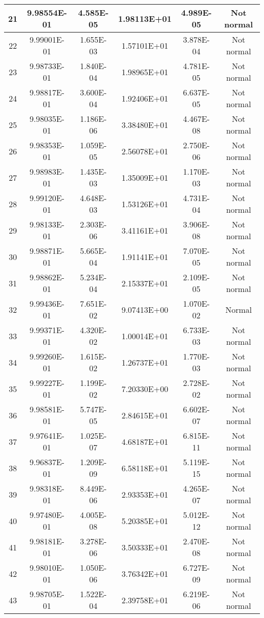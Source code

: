\begin{table}[h]
\begin{tabular}{|c|c|c|c|c|c|}
		21 & 9.98554E-01 & 4.585E-05 & 1.98113E+01 & 4.989E-05 & Not normal\\\hline
		22 & 9.99001E-01 & 1.655E-03 & 1.57101E+01 & 3.878E-04 & Not normal\\\hline
		23 & 9.98733E-01 & 1.840E-04 & 1.98965E+01 & 4.781E-05 & Not normal\\\hline
		24 & 9.98817E-01 & 3.600E-04 & 1.92406E+01 & 6.637E-05 & Not normal\\\hline
		25 & 9.98035E-01 & 1.186E-06 & 3.38480E+01 & 4.467E-08 & Not normal\\\hline
		26 & 9.98353E-01 & 1.059E-05 & 2.56078E+01 & 2.750E-06 & Not normal\\\hline
		27 & 9.98983E-01 & 1.435E-03 & 1.35009E+01 & 1.170E-03 & Not normal\\\hline
		28 & 9.99120E-01 & 4.648E-03 & 1.53126E+01 & 4.731E-04 & Not normal\\\hline
		29 & 9.98133E-01 & 2.303E-06 & 3.41161E+01 & 3.906E-08 & Not normal\\\hline
		30 & 9.98871E-01 & 5.665E-04 & 1.91141E+01 & 7.070E-05 & Not normal\\\hline
		31 & 9.98862E-01 & 5.234E-04 & 2.15337E+01 & 2.109E-05 & Not normal\\\hline
		32 & 9.99436E-01 & 7.651E-02 & 9.07413E+00 & 1.070E-02 & Normal\\\hline
		33 & 9.99371E-01 & 4.320E-02 & 1.00014E+01 & 6.733E-03 & Not normal\\\hline
		34 & 9.99260E-01 & 1.615E-02 & 1.26737E+01 & 1.770E-03 & Not normal\\\hline
		35 & 9.99227E-01 & 1.199E-02 & 7.20330E+00 & 2.728E-02 & Not normal\\\hline
		36 & 9.98581E-01 & 5.747E-05 & 2.84615E+01 & 6.602E-07 & Not normal\\\hline
		37 & 9.97641E-01 & 1.025E-07 & 4.68187E+01 & 6.815E-11 & Not normal\\\hline
		38 & 9.96837E-01 & 1.209E-09 & 6.58118E+01 & 5.119E-15 & Not normal\\\hline
		39 & 9.98318E-01 & 8.449E-06 & 2.93353E+01 & 4.265E-07 & Not normal\\\hline
		40 & 9.97480E-01 & 4.005E-08 & 5.20385E+01 & 5.012E-12 & Not normal\\\hline
		41 & 9.98181E-01 & 3.278E-06 & 3.50333E+01 & 2.470E-08 & Not normal\\\hline
		42 & 9.98010E-01 & 1.050E-06 & 3.76342E+01 & 6.727E-09 & Not normal\\\hline
		43 & 9.98705E-01 & 1.522E-04 & 2.39758E+01 & 6.219E-06 & Not normal\\\hline

\end{tabular}
\end{table}
